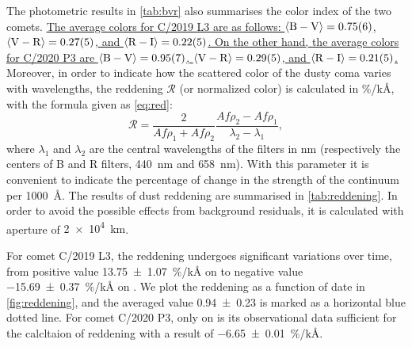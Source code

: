 The photometric results in \autoref{tab:bvr} also summarises the color index of the two comets. \ul{
The average colors for C/2019 L3 are as follows: 
$\langle \mathrm{B} - \mathrm{V} \rangle = \num{0.75 +- 0.06}$, 
$\langle \mathrm{V} - \mathrm{R} \rangle = \num{0.27 +- 0.05}$, and 
$\langle \mathrm{R} - \mathrm{I} \rangle = \num{0.22 +- 0.05}$. 
On the other hand, the average colors for C/2020 P3 are 
$\langle \mathrm{B} - \mathrm{V} \rangle = \num{0.95 +- 0.07}$, 
$\langle \mathrm{V} - \mathrm{R} \rangle = \num{0.29 +- 0.05}$, and 
$\langle \mathrm{R} - \mathrm{I} \rangle = \num{0.21 +- 0.05}$. 
} 
Moreover, in order to indicate how the scattered color of the dusty coma varies with wavelengths, the reddening $\mathcal{R}$ (or normalized color) \citep{jewitt_cometary_1986, lara_behaviour_2003, mazzotta_epifani_dust_2011, shi_ccd_2015} is calculated in \si{\percent/\kilo\angstrom}, with the formula given as \autoref{eq:red}: 
\begin{equation}
\mathcal{R} = \frac{2}{Af\rho_1 + Af\rho_2} \frac{Af\rho_2 - Af\rho_1}{\lambda_2 - \lambda_1}, 
\label{eq:red}
\end{equation}
where $\lambda_1$ and $\lambda_2$ are the central wavelengths of the filters in \si{\nm} (respectively the centers of B and R filters, {\SI{440}{\nm}} and {\SI{658}{\nm}}). With this parameter it is convenient to indicate the percentage of change in the strength of the continuum per {\SI{1000}{\angstrom}}. The results of dust reddening are summarised in \autoref{tab:reddening}. In order to avoid the possible effects from background residuals, it is calculated with aperture of {\SI{2e4}{\km}}. 

For comet C/2019 L3, the reddening undergoes significant variations over time, from positive value {\SI{13.75 +- 1.07}{\percent/\kilo\angstrom}} on  to negative value {\SI{-15.69 +- 0.37}{\percent/\kilo\angstrom}} on . We plot the reddening as a function of date in \autoref{fig:reddening}, and the averaged value \num{0.94 +- 0.23} is marked as a horizontal blue dotted line. For comet C/2020 P3, only on  is its observational data sufficient for the calcltaion of reddening with a result of {\SI{-6.65 +- 0.01}{\percent/\kilo\angstrom}}. 

